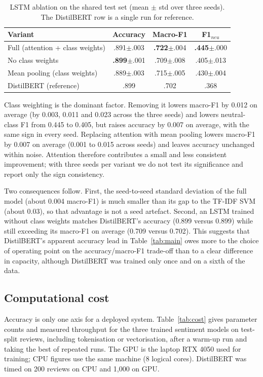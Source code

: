 \documentclass[conference]{IEEEtran}
\begin{document}
\begin{table}[t]
\caption{LSTM ablation on the shared test set (mean $\pm$ std over three seeds). The DistilBERT row is a single run for reference.}
\label{tab:ablation}
\centering
\footnotesize
\setlength{\tabcolsep}{3pt}
\begin{tabular}{@{}lccc@{}}
\toprule
Variant & Accuracy & Macro-F1 & F1$_{neu}$ \\
\midrule
Full (attention + class weights) & .891$\pm$.003 & \textbf{.722}$\pm$.004 & \textbf{.445}$\pm$.000 \\
No class weights & \textbf{.899}$\pm$.001 & .709$\pm$.008 & .405$\pm$.013 \\
Mean pooling (class weights) & .889$\pm$.003 & .715$\pm$.005 & .430$\pm$.004 \\
\midrule
DistilBERT (reference) & .899 & .702 & .368 \\
\bottomrule
\end{tabular}
\end{table}

Class weighting is the dominant factor. Removing it lowers macro-F1 by 0.012 on average (by 0.003, 0.011 and 0.023 across the three seeds) and lowers neutral-class F1 from 0.445 to 0.405, but raises accuracy by 0.007 on average, with the same sign in every seed. Replacing attention with mean pooling lowers macro-F1 by 0.007 on average (0.001 to 0.015 across seeds) and leaves accuracy unchanged within noise. Attention therefore contributes a small and less consistent improvement; with three seeds per variant we do not test its significance and report only the sign consistency.

Two consequences follow. First, the seed-to-seed standard deviation of the full model (about 0.004 macro-F1) is much smaller than its gap to the TF-IDF SVM (about 0.03), so that advantage is not a seed artefact. Second, an LSTM trained without class weights matches DistilBERT's accuracy (0.899 versus 0.899) while still exceeding its macro-F1 on average (0.709 versus 0.702). This suggests that DistilBERT's apparent accuracy lead in Table~\ref{tab:main} owes more to the choice of operating point on the accuracy/macro-F1 trade-off than to a clear difference in capacity, although DistilBERT was trained only once and on a sixth of the data.

\subsection{Computational cost}
Accuracy is only one axis for a deployed system. Table~\ref{tab:cost} gives parameter counts and measured throughput for the three trained sentiment models on test-split reviews, including tokenisation or vectorisation, after a warm-up run and taking the best of repeated runs. The GPU is the laptop RTX 4050 used for training; CPU figures use the same machine (8 logical cores). DistilBERT was timed on 200 reviews on CPU and 1{,}000 on GPU.
\end{document}
